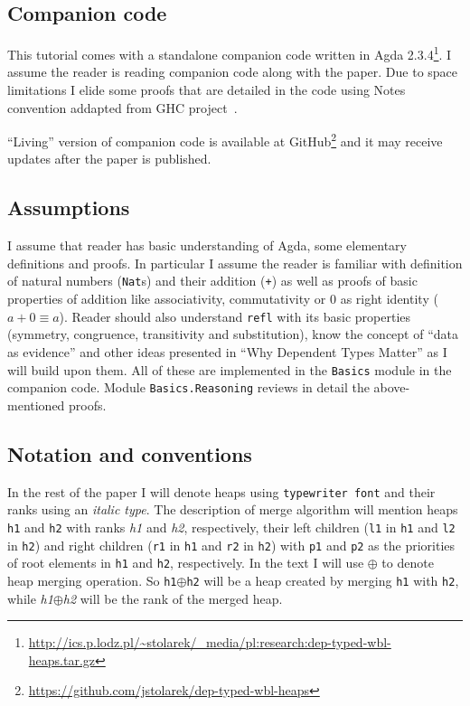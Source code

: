 \subsection{Companion code}

This tutorial comes with a standalone companion code written in Agda 2.3.4\footnote{\url{http://ics.p.lodz.pl/~stolarek/_media/pl:research:dep-typed-wbl-heaps.tar.gz}}. I assume the reader is reading companion code along with the paper. Due to space limitations I elide some proofs that are detailed in the code using Notes convention addapted from GHC project~\cite{MarPey12}.

``Living'' version of companion code is available at GitHub\footnote{\url{https://github.com/jstolarek/dep-typed-wbl-heaps}} and it may receive updates after the paper is published.

\subsection{Assumptions}

I assume that reader has basic understanding of Agda, some elementary definitions and proofs. In particular I assume the reader is familiar with definition of natural numbers (\texttt{Nat}s) and their addition (\texttt{+}) as well as proofs of basic properties of addition like associativity, commutativity or 0 as right identity ($a + 0 ≡ a$). Reader should also understand \texttt{refl} with its basic properties (symmetry, congruence, transitivity and substitution), know the concept of ``data as evidence'' and other ideas presented in ``Why Dependent Types Matter'' \cite{AltMcBMcK05} as I will build upon them. All of these are implemented in the \texttt{Basics} module in the companion code. Module \texttt{Basics.Reasoning} reviews in detail the above-mentioned proofs.

\subsection{Notation and conventions}

In the rest of the paper I will denote heaps using \texttt{typewriter font} and their ranks using an \textit{italic type}. The description of merge algorithm will mention heaps \texttt{h1} and \texttt{h2} with ranks \textit{h1} and \textit{h2}, respectively, their left children (\texttt{l1} in \texttt{h1} and \texttt{l2} in \texttt{h2}) and right children (\texttt{r1} in \texttt{h1} and \texttt{r2} in \texttt{h2}) with \texttt{p1} and \texttt{p2} as the priorities of root elements in \texttt{h1} and \texttt{h2}, respectively. In the text I will use $\oplus$ to denote heap merging operation. So \texttt{h1}$\oplus$\texttt{h2} will be a heap created by merging \texttt{h1} with \texttt{h2}, while \textit{h1}$\oplus$\textit{h2} will be the rank of the merged heap.

